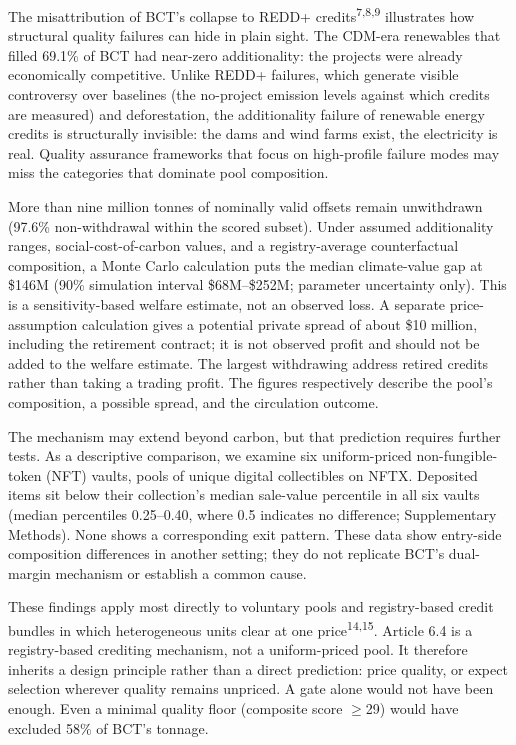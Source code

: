\documentclass[sn-nature,Numbered]{sn-jnl}
\begin{document}
The misattribution of BCT's collapse to REDD+ credits\textsuperscript{7,8,9} illustrates how structural quality failures can hide in plain sight. The CDM-era renewables that filled 69.1\% of BCT had near-zero additionality: the projects were already economically competitive. Unlike REDD+ failures, which generate visible controversy over baselines (the no-project emission levels against which credits are measured) and deforestation, the additionality failure of renewable energy credits is structurally invisible: the dams and wind farms exist, the electricity is real. Quality assurance frameworks that focus on high-profile failure modes may miss the categories that dominate pool composition.

More than nine million tonnes of nominally valid offsets remain unwithdrawn (97.6\% non-withdrawal within the scored subset). Under assumed additionality ranges, social-cost-of-carbon values, and a registry-average counterfactual composition, a Monte Carlo calculation puts the median climate-value gap at \$146M (90\% simulation interval \$68M--\$252M; parameter uncertainty only). This is a sensitivity-based welfare estimate, not an observed loss. A separate price-assumption calculation gives a potential private spread of about \$10 million, including the retirement contract; it is not observed profit and should not be added to the welfare estimate. The largest withdrawing address retired credits rather than taking a trading profit. The figures respectively describe the pool's composition, a possible spread, and the circulation outcome.

The mechanism may extend beyond carbon, but that prediction requires further tests. As a descriptive comparison, we examine six uniform-priced non-fungible-token (NFT) vaults, pools of unique digital collectibles on NFTX. Deposited items sit below their collection's median sale-value percentile in all six vaults (median percentiles 0.25--0.40, where 0.5 indicates no difference; Supplementary Methods). None shows a corresponding exit pattern. These data show entry-side composition differences in another setting; they do not replicate BCT's dual-margin mechanism or establish a common cause.

These findings apply most directly to voluntary pools and registry-based credit bundles in which heterogeneous units clear at one price\textsuperscript{14,15}. Article 6.4 is a registry-based crediting mechanism, not a uniform-priced pool. It therefore inherits a design principle rather than a direct prediction: price quality, or expect selection wherever quality remains unpriced. A gate alone would not have been enough. Even a minimal quality floor (composite score $\geq$29) would have excluded 58\% of BCT's tonnage.
\end{document}
